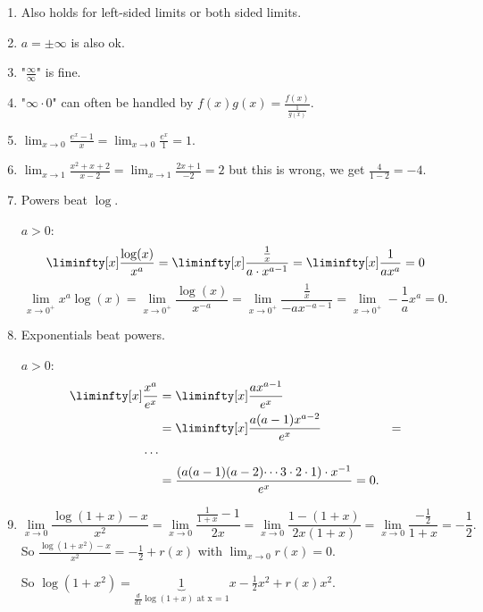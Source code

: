 \documentclass[10pt, a4paper]{article}
\begin{document}
\begin{remark}
    \begin{enumerate}[label = (\roman*)]
        \item Also holds for left-sided limits or both sided limits.

        \item $a = \pm\infty$ is also ok.

        \item "$\frac{\infty}{\infty}$" is fine.

        \item "$\infty \cdot 0$" can often be handled by $f(x)g(x) = \frac{f(x)}{\frac{1}{g(x)}}$.

        \item $\lim_{x \to 0}\frac{e ^ x - 1}{x} = \lim_{x \to 0}\frac{e ^ x}{1} = 1$.

        \item $\lim_{x \to 1}\frac{x ^ 2 + x + 2}{x - 2} = \lim_{x \to 1}\frac{2x + 1}{-2} = 2$ but this is wrong,
        we get $\frac{4}{1 - 2} = -4$.

        \item Powers beat $\log$.
        
        $a > 0$:
        \[
        \liminfty[x]\frac{\log(x)}{x ^ a} = \liminfty[x]\frac{\frac{1}{x}}{a \cdot x ^ {a - 1}} = \liminfty[x]\frac{1}{ax ^ a} = 0
        \]
        \[
        \lim_{x \to 0 ^ {+}}x ^ a\log(x) = \lim_{x \to 0 ^ {+}}\frac{\log(x)}{x ^ {-a}} = \lim_{x \to 0 ^ {+}}\frac{\frac{1}{x}}{-ax ^ {-a - 1}} = \lim_{x \to 0 ^ {+}}-\frac{1}{a}x ^ a = 0.
        \]

        \item Exponentials beat powers.
        
        $a > 0$:
        \begin{align*}
            \liminfty[x]\frac{x ^ a}{e ^ x} &= \liminfty[x]\frac{ax ^ {a - 1}}{e ^ x} \\
            &= \liminfty[x]\frac{a(a - 1)x ^ {a - 2}}{e ^ x} &= \\
            \dotsi \\
            &= \frac{(a(a - 1)(a - 2)\dotsi 3 \cdot 2 \cdot 1) \cdot x ^ {-1}}{e ^ x} = 0.
        \end{align*}

        \item
        \[
        \lim_{x \to 0}\frac{\log(1 + x) - x}{x ^ 2} = \lim_{x \to 0}\frac{\frac{1}{1 + x} - 1}{2x} = \lim_{x \to 0}\frac{1 - (1 + x)}{2x(1 + x)} = \lim_{x \to 0}\frac{-\frac{1}{2}}{1 + x} = -\frac{1}{2}.
        \]
        So $\frac{\log(1 + x ^ 2) - x}{x ^ 2} = -\frac{1}{2} + r(x)$ with $\lim_{x \to 0}r(x) = 0$.

        So $\log(1 + x ^ 2) = \underbrace{1}_{\frac{d}{dx}\log(1 + x)\text{ at x = 1}}x - \frac{1}{2}x ^ 2 + r(x)x ^ 2$.
    \end{enumerate}
\end{remark}
\end{document}
